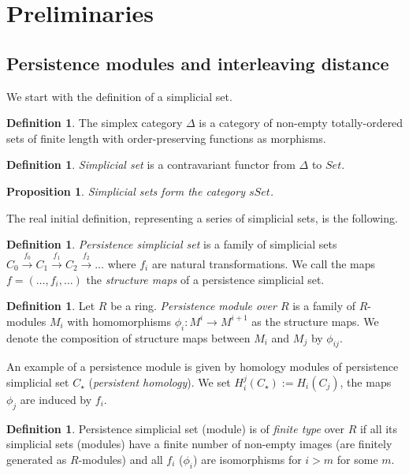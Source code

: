 \documentclass[english,12pt]{article}
\newcounter{stmcounter}[section]
\numberwithin{equation}{section}
\newtheorem{proposition}[stmcounter]{Proposition}
\theoremstyle{definition}
\newtheorem{definition}[stmcounter]{Definition}
\theoremstyle{remark}
\newcommand{\define}[1]{{\textit{#1}}}
\begin{document}
\section{Preliminaries}

\subsection{Persistence modules and interleaving distance}

We start with the definition of a simplicial set.

\begin{definition}
  The simplex category $\Delta$ is a category of non-empty totally-ordered sets of finite length with order-preserving functions as morphisms.
\end{definition}

\begin{definition}
  \define{Simplicial set} is a contravariant functor from $\Delta$ to $Set$.
\end{definition}

\begin{proposition}
  Simplicial sets form the category $sSet$.
\end{proposition}

The real initial definition, representing a series of simplicial sets, is the following.

\begin{definition}
  \define{Persistence simplicial set} is a family of simplicial sets $C_{0} \xrightarrow{f_0} C_{1} \xrightarrow{f_1} C_{2} \xrightarrow{f_2} \ldots$ where $f_i$ are natural transformations. We call the maps $f=(\ldots,f_i,\ldots)$ the \define{structure maps} of a persistence simplicial set.
\end{definition}

\begin{definition}
  Let $R$ be a ring. \define{Persistence module over $R$} is a family of $R$-modules $M_i$ with homomorphisms $\phi_i : M^i \to M^{i+1}$ as the structure maps. We denote the composition of structure maps between $M_i$ and $M_j$ by $\phi_{ij}$.
\end{definition}

An example of a persistence module is given by homology modules of persistence simplicial set $C_{\star}$ (\define{persistent homology}). We set $H_i^j(C_{\star}) := H_i(C_{j})$, the maps $\phi_j$ are induced by $f_i$.\\

\begin{definition}
  Persistence simplicial set (module) is of \define{finite type} over $R$ if all its simplicial sets (modules) have a finite number of non-empty images (are finitely generated as $R$-modules) and all $f_i$ ($\phi_i$) are isomorphisms for $i > m$ for some $m$.
\end{definition}
\end{document}
